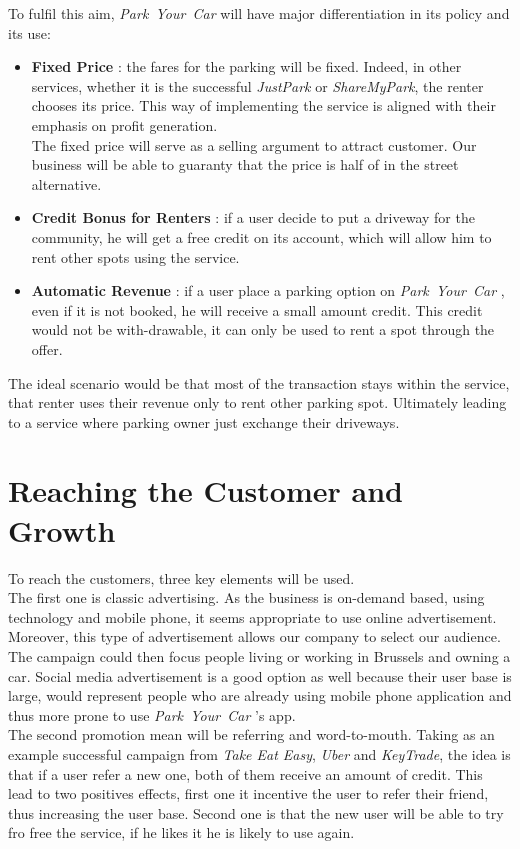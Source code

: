 \documentclass[12pt,a4paper,oneside]{book}
\newcommand{\bp}{\textit{Park~Your~Car }}
\begin{document}
To fulfil this aim, \bp will have major differentiation in its policy and its use:
\begin{itemize}
\item \textbf{Fixed Price} : the fares for the parking will be fixed. Indeed, in other services, whether it is  the successful \textit{JustPark} or \textit{ShareMyPark}, the renter chooses its price. This way of implementing the service is aligned with their emphasis on profit generation.\\
The fixed price will serve as a selling argument to attract customer. Our business will be able to guaranty that the price is half of in the street alternative.
\item \textbf{Credit Bonus for Renters} : if a user decide to put a driveway for the community, he will get a free credit on its account, which will allow him to rent other spots using the service.
\item \textbf{Automatic Revenue} : if a user place a parking option on \bp, even if it is not booked, he will receive a small amount credit. This credit would not be with-drawable, it can only be used to rent a spot through the offer.
\end{itemize}

The ideal scenario would be that most of the transaction stays within the service, that renter uses their revenue only to rent other parking spot. Ultimately leading to a service where parking owner just exchange their driveways.

\section{Reaching the Customer and Growth}
To reach the customers, three key elements will be used.\\

The first one is classic advertising. As the business is on-demand based, using technology and mobile phone, it seems appropriate to use online advertisement. Moreover, this type of advertisement allows our company to select our audience. The campaign could then focus people living or working in Brussels and owning a car. Social media advertisement is a good option as well because their user base is large, would represent people who are already using mobile phone application and thus more prone to use \bp's app.\\

The second promotion mean will be referring and word-to-mouth. Taking as an example successful campaign from \textit{Take Eat Easy}, \textit{Uber} and \textit{KeyTrade}, the idea is that if a user refer a new one, both of them receive an amount of credit. This lead to two positives effects, first one it incentive the user to refer their friend, thus increasing the user base. Second one is that the new user will be able to try fro free the service, if he likes it he is likely to use again.\\
\end{document}

